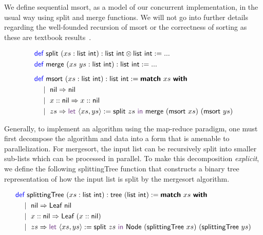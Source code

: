 We define sequential \textsf{msort}, as a model of our concurrent implementation,
in the usual way using \textsf{split} and \textsf{merge} functions.
We will not go into further details regarding the well-founded recursion
of \textsf{msort} or the correctness of sorting as these are textbook results~\cite{cpdt}.

\vspace{-1em}
\begingroup
\small
\addtolength{\jot}{-0.2em}
\begin{align*}
  &\Def\ \textsf{split}\ (xs : \textsf{list}\ \textsf{int}) : \textsf{list}\ \textsf{int} \otimes \textsf{list}\ \textsf{int} := ... \\
  &\Def\ \textsf{merge}\ (xs\ ys : \textsf{list}\ \textsf{int}) : \textsf{list}\ \textsf{int} := ...
  \\[0.5em]
  &\Def\ \textsf{msort}\ (xs : \textsf{list}\ \textsf{int}) : \textsf{list}\ \textsf{int} := \Match\ xs\ \With \\
  &\quad\mid\ \textsf{nil} \Rightarrow \textsf{nil} \\
  &\quad\mid\ x :: \textsf{nil} \Rightarrow x :: \textsf{nil} \\
  &\quad\mid\ zs \Rightarrow \Let\ \langle{xs, ys}\rangle := \textsf{split}\ zs\ \In\ \textsf{merge}\ (\textsf{msort}\ xs)\ (\textsf{msort}\ ys)
\end{align*}
\endgroup

Generally, to implement an algorithm using the map-reduce paradigm, one must first 
decompose the algorithm and data into a form that is amenable to parallelization. 
For mergesort, the input list can be recursively split into smaller sub-lists
which can be processed in parallel. To make this decomposition \emph{explicit},
we define the following \textsf{splittingTree} function that constructs a binary tree
representation of how the input list is split by the mergesort algorithm.

\vspace{-1em}
\begingroup
\small
\addtolength{\jot}{-0.2em}
\begin{align*}
  &\Def\ \textsf{splittingTree}\ (xs : \textsf{list}\ \textsf{int}) : \textsf{tree}\ (\textsf{list}\ \textsf{int}) := \Match\ xs\ \With \\
  &\quad\mid\ \textsf{nil} \Rightarrow \textsf{Leaf}\ \textsf{nil} \\
  &\quad\mid\ x :: \textsf{nil} \Rightarrow \textsf{Leaf}\ (x :: \textsf{nil}) \\
  &\quad\mid\ zs \Rightarrow \Let\ \langle{xs, ys}\rangle := \textsf{split}\ zs\ \In\ \textsf{Node}\ (\textsf{splittingTree}\ xs)\ (\textsf{splittingTree}\ ys)
\end{align*}
\endgroup

